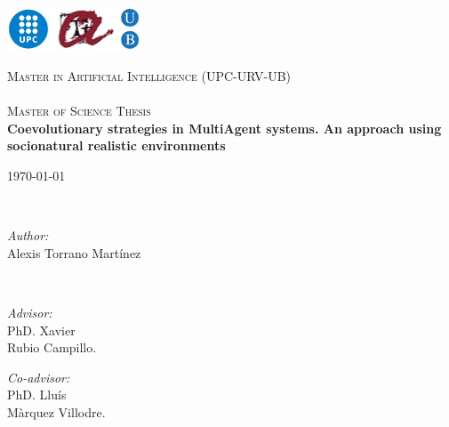 \documentclass[11pt,oneside,a4paper,openright]{report}
\begin{document}
\begin{titlepage}
\begin{left}
\includegraphics[width=0.30\textwidth]{./figures/MasterLogo.jpg}~\\[1cm]
\end{left}
\begin{center}
\textsc{\LARGE Master in Artificial Intelligence (UPC-URV-UB)}\\[1.5cm]
\HRule \\[0.4cm]
\textsc{\Large Master of Science Thesis}\\[0.5cm]

{ \huge \bfseries \huge Coevolutionary strategies in MultiAgent systems. An approach using socionatural realistic environments \\[2.4cm] }

{\large \today}

\\[2.0cm]

\begin{minipage}{0.4\textwidth}
\begin{flushcenter} \large
\emph{Author:}\\
Alexis Torrano Mart\'inez
\end{flushcenter}
\end{minipage}

\\[5.0cm]


\begin{minipage}{0.4\textwidth}
\begin{flushleft} \large
\emph{Advisor:}\\
PhD. Xavier\\ Rubio Campillo.
\end{flushleft}
\end{minipage}
\begin{minipage}{0.4\textwidth}
\begin{flushright} \large
\emph{Co-advisor:} \\
PhD. Llu\'is\\ M\`arquez Villodre.
\end{flushright}
\end{minipage}


\end{center}
\end{titlepage}
\end{document}
